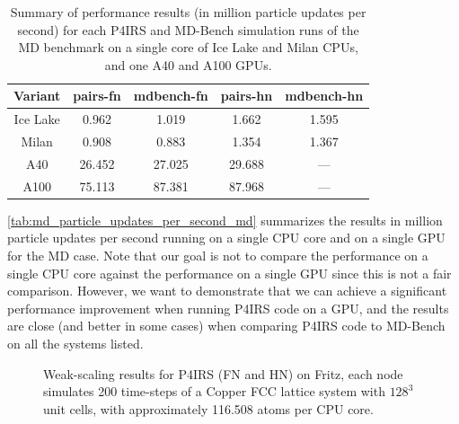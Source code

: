 \documentclass[Afour,sageh,times]{sagej}
\newcommand{\RMchange}[1]{{\color{blue} #1}}
\begin{document}
\begin{table}[htb]
    \centering
    \begin{tabular}{c|c|c|c|c}
        Variant & pairs-fn & mdbench-fn & pairs-hn & mdbench-hn \\
        \hline
        Ice Lake & 0.962 & 1.019 & 1.662 & 1.595 \\
        Milan & 0.908 & 0.883 & 1.354 & 1.367 \\
        A40  & 26.452 & 27.025 & 29.688 & --- \\
        A100 & 75.113 & 87.381 & 87.968 & --- \\
    \end{tabular}
    \caption{\RMchange{Summary of performance results (in million particle updates per second) for each P4IRS and MD-Bench simulation runs of the MD benchmark on a single core of Ice Lake and Milan CPUs, and one A40 and A100 GPUs.}}
    \label{tab:md_particle_updates_per_second_md}
\end{table}

\RMchange{\autoref{tab:md_particle_updates_per_second_md} summarizes the results in million particle updates per second running on a single CPU core and on a single GPU for the \ac{MD} case.
Note that our goal is not to compare the performance on a single CPU core against the performance on a single GPU since this is not a fair comparison.
However, we want to demonstrate that we can achieve a significant performance improvement when running P4IRS code on a GPU, and the results are close (and better in some cases) when comparing P4IRS code to MD-Bench on all the systems listed.}

\begin{figure}[t]
\centering
{}
\vspace{-2ex}
\caption{Weak-scaling results for P4IRS (FN and HN) on Fritz, each node simulates 200 time-steps of a Copper FCC lattice system with $128^3$ unit cells, with approximately 116.508 atoms per CPU core.}
\vspace{-2ex}
\label{fig:md_weak_scaling_fritz}
\end{figure}
\end{document}
